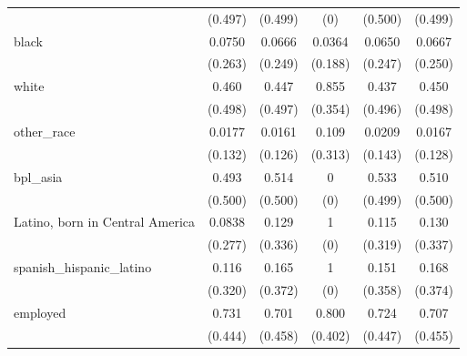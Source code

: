 \begin{table}[htbp]
\begin{tabular}{l*{5}{c}}
                    &     (0.497)         &     (0.499)         &         (0)         &     (0.500)         &     (0.499)         \\
[1em]
black               &      0.0750         &      0.0666         &      0.0364         &      0.0650         &      0.0667         \\
                    &     (0.263)         &     (0.249)         &     (0.188)         &     (0.247)         &     (0.250)         \\
[1em]
white               &       0.460         &       0.447         &       0.855         &       0.437         &       0.450         \\
                    &     (0.498)         &     (0.497)         &     (0.354)         &     (0.496)         &     (0.498)         \\
[1em]
other\_race          &      0.0177         &      0.0161         &       0.109         &      0.0209         &      0.0167         \\
                    &     (0.132)         &     (0.126)         &     (0.313)         &     (0.143)         &     (0.128)         \\
[1em]
bpl\_asia            &       0.493         &       0.514         &           0         &       0.533         &       0.510         \\
                    &     (0.500)         &     (0.500)         &         (0)         &     (0.499)         &     (0.500)         \\
[1em]
Latino, born in Central America&      0.0838         &       0.129         &           1         &       0.115         &       0.130         \\
                    &     (0.277)         &     (0.336)         &         (0)         &     (0.319)         &     (0.337)         \\
[1em]
spanish\_hispanic\_latino&       0.116         &       0.165         &           1         &       0.151         &       0.168         \\
                    &     (0.320)         &     (0.372)         &         (0)         &     (0.358)         &     (0.374)         \\
[1em]
employed            &       0.731         &       0.701         &       0.800         &       0.724         &       0.707         \\
                    &     (0.444)         &     (0.458)         &     (0.402)         &     (0.447)         &     (0.455)         \\

\end{tabular}
\end{table}
